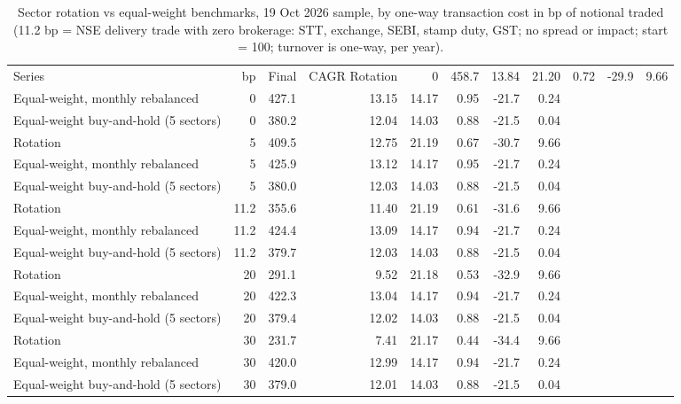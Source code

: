 \begin{table}[ht]
\centering
\small
\caption{Sector rotation vs equal-weight benchmarks, 19 Oct 2026 sample, by one-way transaction cost in bp of notional traded (11.2 bp = NSE delivery trade with zero brokerage: STT, exchange, SEBI, stamp duty, GST; no spread or impact; start = 100; turnover is one-way, per year).}
\label{tab:backtest-costs}
\begin{tabular}{lrrrrrrr}
\toprule
Series & bp & Final & CAGR %
\midrule
Rotation & 0 & 458.7 & 13.84 & 21.20 & 0.72 & -29.9 & 9.66 \\
Equal-weight, monthly rebalanced & 0 & 427.1 & 13.15 & 14.17 & 0.95 & -21.7 & 0.24 \\
Equal-weight buy-and-hold (5 sectors) & 0 & 380.2 & 12.04 & 14.03 & 0.88 & -21.5 & 0.04 \\
Rotation & 5 & 409.5 & 12.75 & 21.19 & 0.67 & -30.7 & 9.66 \\
Equal-weight, monthly rebalanced & 5 & 425.9 & 13.12 & 14.17 & 0.95 & -21.7 & 0.24 \\
Equal-weight buy-and-hold (5 sectors) & 5 & 380.0 & 12.03 & 14.03 & 0.88 & -21.5 & 0.04 \\
Rotation & 11.2 & 355.6 & 11.40 & 21.19 & 0.61 & -31.6 & 9.66 \\
Equal-weight, monthly rebalanced & 11.2 & 424.4 & 13.09 & 14.17 & 0.94 & -21.7 & 0.24 \\
Equal-weight buy-and-hold (5 sectors) & 11.2 & 379.7 & 12.03 & 14.03 & 0.88 & -21.5 & 0.04 \\
Rotation & 20 & 291.1 & 9.52 & 21.18 & 0.53 & -32.9 & 9.66 \\
Equal-weight, monthly rebalanced & 20 & 422.3 & 13.04 & 14.17 & 0.94 & -21.7 & 0.24 \\
Equal-weight buy-and-hold (5 sectors) & 20 & 379.4 & 12.02 & 14.03 & 0.88 & -21.5 & 0.04 \\
Rotation & 30 & 231.7 & 7.41 & 21.17 & 0.44 & -34.4 & 9.66 \\
Equal-weight, monthly rebalanced & 30 & 420.0 & 12.99 & 14.17 & 0.94 & -21.7 & 0.24 \\
Equal-weight buy-and-hold (5 sectors) & 30 & 379.0 & 12.01 & 14.03 & 0.88 & -21.5 & 0.04 \\
\bottomrule
\end{tabular}
\end{table}
